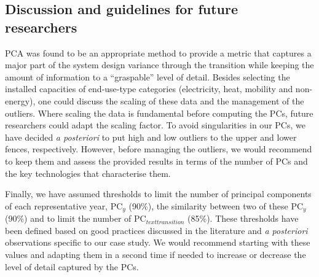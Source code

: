 \subsection{Discussion and guidelines for future researchers}
\label{subsec:meth:PCA:discussion}
\acrfull{PCA} was found to be an appropriate method to provide a metric that captures a major part of the system design variance through the transition while keeping the amount of information to a ``graspable'' level of detail. Besides selecting the installed capacities of end-use-type categories (electricity, heat, mobility and non-energy), one could discuss the scaling of these data and the management of the outliers. Where scaling the data is fundamental before computing the PCs, future researchers could adapt the scaling factor. To avoid singularities in our PCs, we have decided \textit{a posteriori} to put high and low outliers to the upper and lower fences, respectively. However, before managing the outliers, we would recommend to keep them and assess the provided results in terms of the number of PCs and the key technologies that characterise them.

Finally, we have assumed thresholds to limit the number of principal components of each representative year, $\text{PC}_y$ (90\%), the similarity between two of these $\text{PC}_y$ (90\%) and to limit the number of $\text{PC}_{text{transition}}$ (85\%). These thresholds have been defined based on good practices discussed in the literature and \textit{a posteriori} observations specific to our case study. We would recommend starting with these values and adapting them in a second time if needed to increase or decrease the level of detail captured by the PCs.